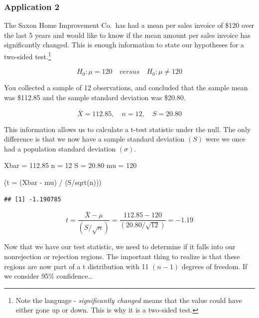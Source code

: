 \documentclass[
]{book}
\newenvironment{Shaded}{\begin{snugshade}}{\end{snugshade}}
\newcommand{\AttributeTok}[1]{\textcolor[rgb]{0.77,0.63,0.00}{#1}}
\newcommand{\DecValTok}[1]{\textcolor[rgb]{0.00,0.00,0.81}{#1}}
\newcommand{\FloatTok}[1]{\textcolor[rgb]{0.00,0.00,0.81}{#1}}
\newcommand{\FunctionTok}[1]{\textcolor[rgb]{0.00,0.00,0.00}{#1}}
\newcommand{\NormalTok}[1]{#1}
\newcommand{\OtherTok}[1]{\textcolor[rgb]{0.56,0.35,0.01}{#1}}
\newcommand{\SpecialCharTok}[1]{\textcolor[rgb]{0.00,0.00,0.00}{#1}}
\begin{document}
\hypertarget{application-2-1}{%
\subsubsection*{Application 2}\label{application-2-1}}

The Saxon Home Improvement Co.~has had a mean per sales invoice of \$120 over the last 5 years and would like to know if the mean amount per sales invoice has significantly changed. This is enough information to state our hypotheses for a two-sided test.\footnote{Note the language - \emph{significantly changed} means that the value could have either gone up or down. This is why it is a two-sided test.}

\[H_0:\mu=120 \quad versus \quad H_0:\mu \neq 120\]

You collected a sample of 12 observations, and concluded that the sample mean was \$112.85 and the sample standard deviation was \$20.80.

\[\bar{X}=112.85, \quad n=12, \quad S=20.80\]

This information allows us to calculate a t-test statistic under the null. The only difference is that we now have a sample standard deviation \((S)\) were we once had a population standard deviation \((\sigma)\).

\begin{Shaded}
\begin{Highlighting}[]
\NormalTok{Xbar }\OtherTok{=} \FloatTok{112.85}
\NormalTok{n }\OtherTok{=} \DecValTok{12}
\NormalTok{S }\OtherTok{=} \FloatTok{20.80}
\NormalTok{mu }\OtherTok{=} \DecValTok{120}

\NormalTok{(}\AttributeTok{t =}\NormalTok{ (Xbar }\SpecialCharTok{{-}}\NormalTok{ mu) }\SpecialCharTok{/}\NormalTok{ (S}\SpecialCharTok{/}\FunctionTok{sqrt}\NormalTok{(n)))}
\end{Highlighting}
\end{Shaded}

\begin{verbatim}
## [1] -1.190785
\end{verbatim}

\[ t = \frac{\bar{X}-\mu}{\left(S / \sqrt{n} \right)}=\frac{112.85-120}{\left(20.80 / \sqrt{12} \right)}=-1.19\]

Now that we have our test statistic, we need to determine if it falls into our nonrejection or rejection regions. The important thing to realize is that these regions are now part of a t distribution with 11 \((n-1)\) degrees of freedom. If we consider 95\% confidence\ldots{}
\end{document}
